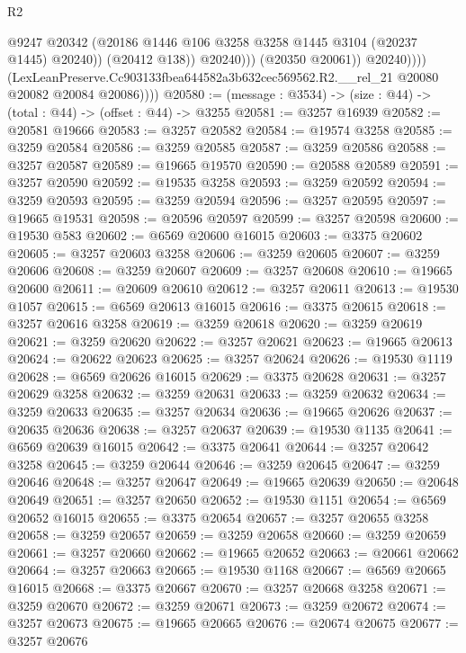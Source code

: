 \begin{lexlean}{R2}
\begin{coremodule}
                              @9247
                              @20342
                              (@20186 @1446 @106 @3258 @3258 @1445 @3104 (@20237 @1445) @20240))
                            (@20412 @138))
                          @20240)))
                    (@20350 @20061))
                  @20240))))
          (LexLeanPreserve.Cc903133fbea644582a3b632cec569562.R2.__rel_21
            @20080
            @20082
            @20084
            @20086))))
@20580 := (message : @3534) -> (size : @44) -> (total : @44) -> (offset : @44) -> @3255
@20581 := @3257 @16939
@20582 := @20581 @19666
@20583 := @3257 @20582
@20584 := @19574 @3258
@20585 := @3259 @20584
@20586 := @3259 @20585
@20587 := @3259 @20586
@20588 := @3257 @20587
@20589 := @19665 @19570
@20590 := @20588 @20589
@20591 := @3257 @20590
@20592 := @19535 @3258
@20593 := @3259 @20592
@20594 := @3259 @20593
@20595 := @3259 @20594
@20596 := @3257 @20595
@20597 := @19665 @19531
@20598 := @20596 @20597
@20599 := @3257 @20598
@20600 := @19530 @583
@20602 := @6569 @20600 @16015
@20603 := @3375 @20602
@20605 := @3257 @20603 @3258
@20606 := @3259 @20605
@20607 := @3259 @20606
@20608 := @3259 @20607
@20609 := @3257 @20608
@20610 := @19665 @20600
@20611 := @20609 @20610
@20612 := @3257 @20611
@20613 := @19530 @1057
@20615 := @6569 @20613 @16015
@20616 := @3375 @20615
@20618 := @3257 @20616 @3258
@20619 := @3259 @20618
@20620 := @3259 @20619
@20621 := @3259 @20620
@20622 := @3257 @20621
@20623 := @19665 @20613
@20624 := @20622 @20623
@20625 := @3257 @20624
@20626 := @19530 @1119
@20628 := @6569 @20626 @16015
@20629 := @3375 @20628
@20631 := @3257 @20629 @3258
@20632 := @3259 @20631
@20633 := @3259 @20632
@20634 := @3259 @20633
@20635 := @3257 @20634
@20636 := @19665 @20626
@20637 := @20635 @20636
@20638 := @3257 @20637
@20639 := @19530 @1135
@20641 := @6569 @20639 @16015
@20642 := @3375 @20641
@20644 := @3257 @20642 @3258
@20645 := @3259 @20644
@20646 := @3259 @20645
@20647 := @3259 @20646
@20648 := @3257 @20647
@20649 := @19665 @20639
@20650 := @20648 @20649
@20651 := @3257 @20650
@20652 := @19530 @1151
@20654 := @6569 @20652 @16015
@20655 := @3375 @20654
@20657 := @3257 @20655 @3258
@20658 := @3259 @20657
@20659 := @3259 @20658
@20660 := @3259 @20659
@20661 := @3257 @20660
@20662 := @19665 @20652
@20663 := @20661 @20662
@20664 := @3257 @20663
@20665 := @19530 @1168
@20667 := @6569 @20665 @16015
@20668 := @3375 @20667
@20670 := @3257 @20668 @3258
@20671 := @3259 @20670
@20672 := @3259 @20671
@20673 := @3259 @20672
@20674 := @3257 @20673
@20675 := @19665 @20665
@20676 := @20674 @20675
@20677 := @3257 @20676

\end{coremodule}
\end{lexlean}
